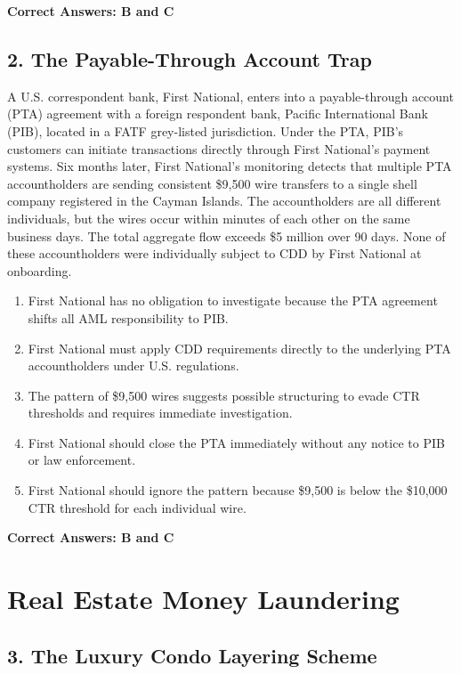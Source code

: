 \documentclass[11pt,a4paper]{article}
\begin{document}
	\textbf{Correct Answers: B and C}
	
	\subsection{2. The Payable-Through Account Trap}
	
	A U.S. correspondent bank, First National, enters into a payable-through account (PTA) agreement with a foreign respondent bank, Pacific International Bank (PIB), located in a FATF grey-listed jurisdiction. Under the PTA, PIB's customers can initiate transactions directly through First National's payment systems. Six months later, First National's monitoring detects that multiple PTA accountholders are sending consistent \$9,500 wire transfers to a single shell company registered in the Cayman Islands. The accountholders are all different individuals, but the wires occur within minutes of each other on the same business days. The total aggregate flow exceeds \$5 million over 90 days. None of these accountholders were individually subject to CDD by First National at onboarding.
	
	\begin{enumerate}[label=\Alph*.]
		\item First National has no obligation to investigate because the PTA agreement shifts all AML responsibility to PIB.
		\item First National must apply CDD requirements directly to the underlying PTA accountholders under U.S. regulations.
		\item The pattern of \$9,500 wires suggests possible structuring to evade CTR thresholds and requires immediate investigation.
		\item First National should close the PTA immediately without any notice to PIB or law enforcement.
		\item First National should ignore the pattern because \$9,500 is below the \$10,000 CTR threshold for each individual wire.
	\end{enumerate}
	
	\textbf{Correct Answers: B and C}
	
	\section{Real Estate Money Laundering}
	
	\subsection{3. The Luxury Condo Layering Scheme}
	
\end{document}
